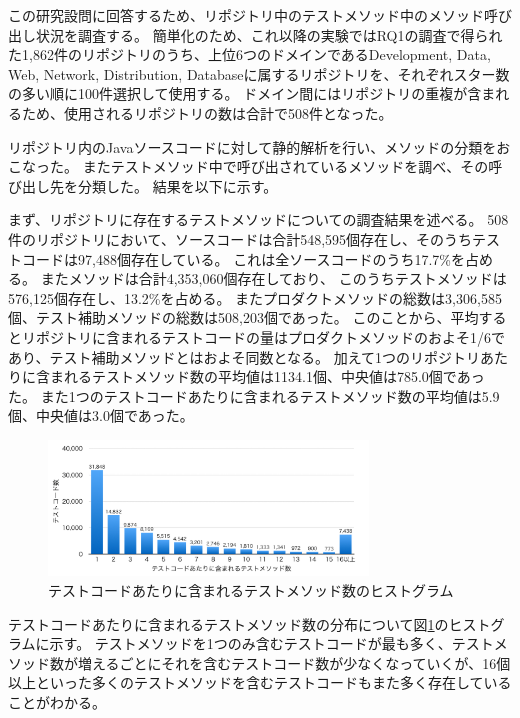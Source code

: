 \documentclass[conference]{IEEEtran}
\begin{document}
この研究設問に回答するため、リポジトリ中のテストメソッド中のメソッド呼び出し状況を調査する。
簡単化のため、これ以降の実験ではRQ1の調査で得られた1,862件のリポジトリのうち、上位6つのドメインであるDevelopment, Data, Web, Network, Distribution, Databaseに属するリポジトリを、それぞれスター数の多い順に100件選択して使用する。
ドメイン間にはリポジトリの重複が含まれるため、使用されるリポジトリの数は合計で508件となった。

リポジトリ内のJavaソースコードに対して静的解析を行い、メソッドの分類をおこなった。
またテストメソッド中で呼び出されているメソッドを調べ、その呼び出し先を分類した。
結果を以下に示す。

まず、リポジトリに存在するテストメソッドについての調査結果を述べる。
508件のリポジトリにおいて、ソースコードは合計548,595個存在し、そのうちテストコードは97,488個存在している。
これは全ソースコードのうち17.7\%を占める。
またメソッドは合計4,353,060個存在しており、
このうちテストメソッドは576,125個存在し、13.2\%を占める。
またプロダクトメソッドの総数は3,306,585個、テスト補助メソッドの総数は508,203個であった。
このことから、平均するとリポジトリに含まれるテストコードの量はプロダクトメソッドのおよそ1/6であり、テスト補助メソッドとはおよそ同数となる。
加えて1つのリポジトリあたりに含まれるテストメソッド数の平均値は1134.1個、中央値は785.0個であった。
また1つのテストコードあたりに含まれるテストメソッド数の平均値は5.9個、中央値は3.0個であった。


\begin{figure}[tb]
\begin{center}
\includegraphics[width=8.5cm]{img/testcodes.pdf}
\caption{テストコードあたりに含まれるテストメソッド数のヒストグラム}
\label{testcodes}
\end{center}
\end{figure}

テストコードあたりに含まれるテストメソッド数の分布について図\ref{testcodes}のヒストグラムに示す。
テストメソッドを1つのみ含むテストコードが最も多く、テストメソッド数が増えるごとにそれを含むテストコード数が少なくなっていくが、16個以上といった多くのテストメソッドを含むテストコードもまた多く存在していることがわかる。
\end{document}
